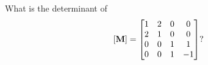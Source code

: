 \bexo
What is the determinant of 
\begin{equation}
\left[ \textbf{M} \right]=
\begin{bmatrix}
	1& 2& 0& 0\\
2& 1& 0& 0\\
0& 0& 1& 1\\
0& 0& 1& -1
\end{bmatrix} ?
\end{equation}
\eexo


